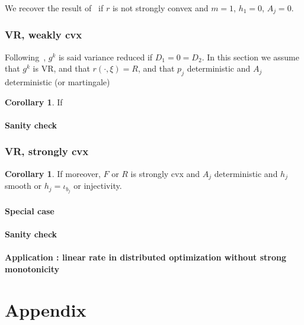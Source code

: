\documentclass{article}
\theoremstyle{definition}
\newtheorem{corollary}[theorem]{Corollary}
\begin{document}
We recover the result of~\cite{gorbunov2019unified} if $r$ is not strongly convex and $m=1$, $h_1=0$, $A_j = 0$.

\section{VR, weakly cvx}

Following~\cite{gorbunov2019unified}, $g^k$ is said variance reduced if $D_1 = 0 = D_2$.
In this section we assume that $g^k$ is VR, and that $r(\cdot,\xi) = R$, and that $p_j$ deterministic and $A_j$ deterministic (or martingale)

\begin{corollary}
If 
\end{corollary}

\subsection{Sanity check}

\section{VR, strongly cvx}



\begin{corollary}
If moreover, $F$ or $R$ is strongly cvx and $A_j$ deterministic and $h_j$ smooth or $h_j = \iota_{b_j}$ or injectivity.
\end{corollary}

\subsection{Special case}



\subsection{Sanity check}

\subsection{Application : linear rate in distributed optimization without strong monotonicity}





\part{Appendix}
\end{document}
